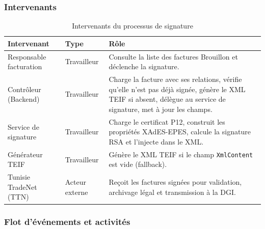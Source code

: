 \documentclass[a4paper,12pt]{report}
\begin{document}
\subsubsection*{Intervenants}

\begin{table}[htbp]
\centering
\caption{Intervenants du processus de signature}
\label{tab:intervenants_b}
\begin{tabularx}{\textwidth}{|l|l|X|}
\hline
\textbf{Intervenant} & \textbf{Type} & \textbf{Rôle} \\
\hline
Responsable facturation & Travailleur & Consulte la liste des factures \og{}Brouillon\fg{} et déclenche la signature. \\
\hline
Contrôleur (Backend) & Travailleur & Charge la facture avec ses relations, vérifie qu'elle n'est pas déjà signée, génère le XML TEIF si absent, délègue au service de signature, met à jour les champs. \\
\hline
Service de signature & Travailleur & Charge le certificat P12, construit les propriétés XAdES-EPES, calcule la signature RSA et l'injecte dans le XML. \\
\hline
Générateur TEIF & Travailleur & Génère le XML TEIF si le champ \texttt{XmlContent} est vide (fallback). \\
\hline
Tunisie TradeNet (TTN) & Acteur externe & Reçoit les factures signées pour validation, archivage légal et transmission à la DGI. \\
\hline
\end{tabularx}
\end{table}

\subsubsection*{Flot d'événements et activités}
\end{document}
